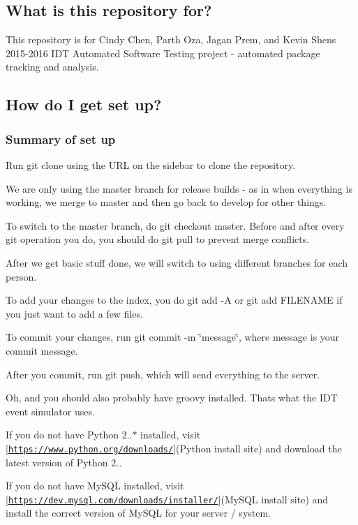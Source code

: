 \subsection*{What is this repository for?}

This repository is for Cindy Chen, Parth Oza, Jagan Prem, and Kevin Shen\textquotesingle{}s 2015-\/2016 I\+DT Automated Software Testing project -\/ automated package tracking and analysis.

\subsection*{How do I get set up?}

\subsubsection*{Summary of set up}

Run {\ttfamily git clone} using the U\+RL on the sidebar to clone the repository.

We are only using the {\ttfamily master} branch for release builds -\/ as in when everything is working, we merge to master and then go back to develop for other things.

To switch to the {\ttfamily master} branch, do {\ttfamily git checkout master}. Before and after every {\ttfamily git} operation you do, you should do {\ttfamily git pull} to prevent merge conflicts.

After we get basic stuff done, we will switch to using different branches for each person.

To add your changes to the {\ttfamily index}, you do {\ttfamily git add -\/A} or {\ttfamily git add F\+I\+L\+E\+N\+A\+ME} if you just want to add a few files.

To commit your changes, run {\ttfamily git commit -\/m \char`\"{}message\char`\"{}}, where message is your commit message.

After you commit, run {\ttfamily git push}, which will send everything to the server.

Oh, and you should also probably have {\ttfamily groovy} installed. That\textquotesingle{}s what the I\+DT event simulator uses.

If you do not have Python 2..$\ast$ installed, visit \mbox{[}\href{https://www.python.org/downloads/}{\tt https\+://www.\+python.\+org/downloads/}\mbox{]}(Python install site) and download the latest version of Python 2..

If you do not have My\+S\+QL installed, visit \mbox{[}\href{https://dev.mysql.com/downloads/installer/}{\tt https\+://dev.\+mysql.\+com/downloads/installer/}\mbox{]}(My\+S\+QL install site) and install the correct version of My\+S\+QL for your server / system.

